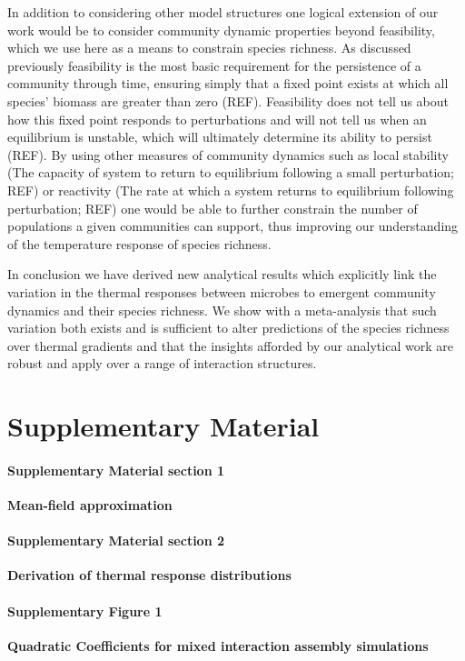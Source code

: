 \documentclass{article}
\begin{document}
In addition to considering other model structures one logical extension of our work would be to consider community dynamic properties beyond feasibility, which we use here as a means to constrain species richness. As discussed previously feasibility is the most basic requirement for the persistence of a community through time, ensuring simply that a fixed point exists at which all species' biomass are greater than zero (REF). Feasibility does not tell us about how this fixed point responds to perturbations and will not tell us when an equilibrium is unstable, which will ultimately determine its ability to persist (REF). By using other measures of community dynamics such as local stability (The capacity of system to return to equilibrium following a small perturbation; REF) or reactivity (The rate at which a system returns to equilibrium following perturbation; REF) one would be able to further constrain the number of populations a given communities can support, thus improving our understanding of the temperature response of species richness. 

In conclusion we have derived new analytical results which explicitly link the variation in the thermal responses between microbes to emergent community dynamics and their species richness. We show with a meta-analysis that such variation both exists and is sufficient to alter predictions of the species richness over thermal gradients and that the insights afforded by our analytical work are robust and apply over a range of interaction structures.

\newpage



\section*{Supplementary Material}

\paragraph{Supplementary Material section 1} \textbf{Mean-field approximation}

\paragraph{Supplementary Material section 2} \textbf{Derivation of thermal response distributions}

\paragraph{Supplementary Figure 1} \textbf{Quadratic Coefficients for mixed interaction assembly simulations}
\end{document}
